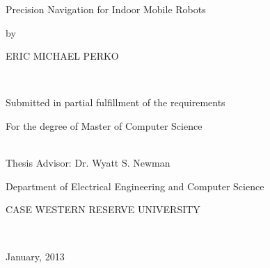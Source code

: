 \begin{titlepage}
    \begin{doublespace}
        \begin{center}
            \vspace*{0.5in}

            { \Large Precision Navigation for Indoor Mobile Robots }\\[0.5in]

            { \large by
            
            ERIC MICHAEL PERKO }\\[0.5in]

            { \large Submitted in partial fulfillment of the requirements
            
            For the degree of Master of Computer Science}\\[0.5in]

            { \large Thesis Advisor: Dr. Wyatt S. Newman}\\[0.5in]

            { \large Department of Electrical Engineering and Computer Science
            
            CASE WESTERN RESERVE UNIVERSITY}\\[0.5in]

            \vfill

            { \large January, 2013}\\[0.5in]
        \end{center}
    \end{doublespace}
\end{titlepage}